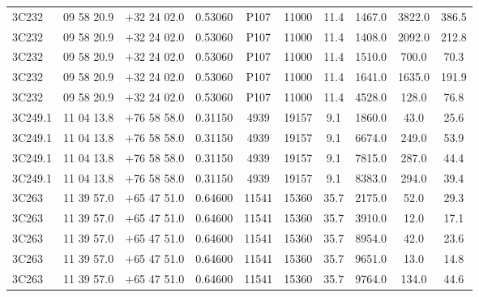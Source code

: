 \begin{landscape}
\begin{center}
\begin{longtable}{l c c c c c c c c c}
3C232  &                   09 58 20.9  &         $+$32 24 02.0  &       0.53060  & P107  &    11000  &      11.4  &      1467.0  &  3822.0  & 386.5  \\
3C232  &                   09 58 20.9  &         $+$32 24 02.0  &       0.53060  & P107  &    11000  &      11.4  &      1408.0  &  2092.0  & 212.8  \\
3C232  &                   09 58 20.9  &         $+$32 24 02.0  &       0.53060  & P107  &    11000  &      11.4  &      1510.0  &  700.0  &  70.3  \\
3C232  &                   09 58 20.9  &         $+$32 24 02.0  &       0.53060  & P107  &    11000  &      11.4  &      1641.0  &  1635.0  & 191.9  \\
3C232  &                   09 58 20.9  &         $+$32 24 02.0  &       0.53060  & P107  &    11000  &      11.4  &      4528.0  &  128.0  &  76.8  \\
3C249.1  &                 11 04 13.8  &         $+$76 58 58.0  &       0.31150  & 4939  &    19157  &      9.1  &       1860.0  &  43.0  &   25.6  \\
3C249.1  &                 11 04 13.8  &         $+$76 58 58.0  &       0.31150  & 4939  &    19157  &      9.1  &       6674.0  &  249.0  &  53.9  \\
3C249.1  &                 11 04 13.8  &         $+$76 58 58.0  &       0.31150  & 4939  &    19157  &      9.1  &       7815.0  &  287.0  &  44.4  \\
3C249.1  &                 11 04 13.8  &         $+$76 58 58.0  &       0.31150  & 4939  &    19157  &      9.1  &       8383.0  &  294.0  &  39.4  \\
3C263  &                   11 39 57.0  &         $+$65 47 51.0  &       0.64600  & 11541  &   15360  &      35.7  &      2175.0  &  52.0  &   29.3  \\
3C263  &                   11 39 57.0  &         $+$65 47 51.0  &       0.64600  & 11541  &   15360  &      35.7  &      3910.0  &  12.0  &   17.1  \\
3C263  &                   11 39 57.0  &         $+$65 47 51.0  &       0.64600  & 11541  &   15360  &      35.7  &      8954.0  &  42.0  &   23.6  \\
3C263  &                   11 39 57.0  &         $+$65 47 51.0  &       0.64600  & 11541  &   15360  &      35.7  &      9651.0  &  13.0  &   14.8  \\
3C263  &                   11 39 57.0  &         $+$65 47 51.0  &       0.64600  & 11541  &   15360  &      35.7  &      9764.0  &  134.0  &  44.6  \\

\end{longtable}
\end{center}
\end{landscape}
